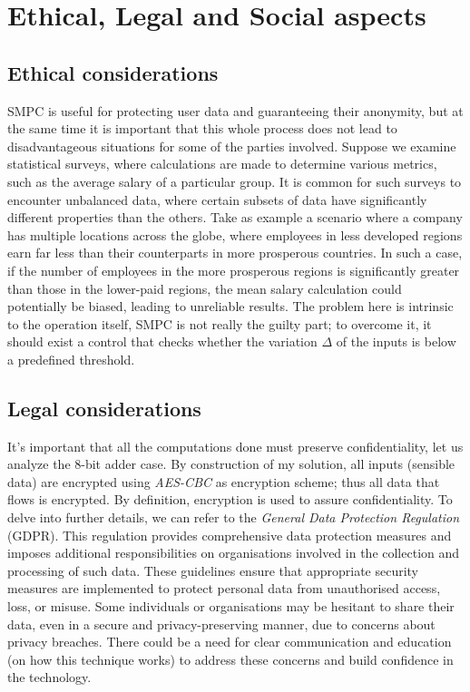 \documentclass[12pt]{article}
\begin{document}
\section{Ethical, Legal and Social aspects}\label{sec:sel}
\subsection{Ethical considerations}
SMPC is useful for protecting user data and guaranteeing their anonymity, but at the same time it is important that this whole process does not lead to disadvantageous situations for some of the parties involved. Suppose we examine statistical surveys, where calculations are made to determine various metrics, such as the average salary of a particular group. It is common for such surveys to encounter unbalanced data, where certain subsets of data have significantly different properties than the others. Take as example a scenario where a company has multiple locations across the globe, where employees in less developed regions earn far less than their counterparts in more prosperous countries. In such a case, if the number of employees in the more prosperous regions is significantly greater than those in the lower-paid regions, the mean salary calculation could potentially be biased, leading to unreliable results. The problem here is intrinsic to the operation itself, SMPC is not really the guilty part; to overcome it, it should exist a control that checks whether the variation $\Delta$ of the inputs is below a predefined threshold.

\subsection{Legal considerations}
It's important that all the computations done must preserve confidentiality, let us analyze the 8-bit adder case. By construction of my solution, all inputs (sensible data) are encrypted using \textit{AES-CBC} as encryption scheme; thus all data that flows is encrypted. By definition, encryption is used to assure confidentiality. To delve into further details, we can refer to the \textit{General Data Protection Regulation} (GDPR). This regulation provides comprehensive data protection measures and imposes additional responsibilities on organisations involved in the collection and processing of such data. These guidelines ensure that appropriate security measures are implemented to protect personal data from unauthorised access, loss, or misuse. Some individuals or organisations may be hesitant to share their data, even in a secure and privacy-preserving manner, due to concerns about privacy breaches. There could be a need for clear communication and education (on how this technique works) to address these concerns and build confidence in the technology.
\end{document}
